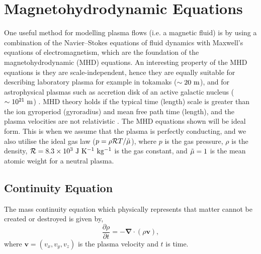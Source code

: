 \documentclass[12pt]{ociamthesis}
\newcommand{\bs}[1]{\boldsymbol{#1}}
\newcommand{\bn}{\boldsymbol{\nabla}}
\newcommand{\rgas}{\mathcal{R}}
\begin{document}
\section{Magnetohydrodynamic Equations}
\label{section:MHD_eqs}
One useful method for modelling plasma flows (i.e. a magnetic fluid) is by using a combination of the Navier–Stokes equations of fluid dynamics with Maxwell's equations of electromagnetism, which are the foundation of the magnetohydrodynamic (MHD) equations. An interesting property of the MHD equations is they are scale-independent, hence they are equally suitable for describing laboratory plasma for example in tokamaks ($\sim 20~\rm{m}$), and for astrophysical plasmas such as accretion disk of an active galactic nucleus ($\sim 10^{21}~\rm{m}$) \citep{goedbloed2004principles}. MHD theory holds if the typical time (length) scale is greater than the ion gyroperiod (gyroradius) and mean free path time (length), and the plasma velocities are not relativistic \citep{priest2014magnetohydrodynamics}. The MHD equations shown will be ideal form. This is when we assume that the plasma is perfectly conducting, and we also utilise the ideal gas law ($p = \rho \rgas T/\Tilde{\mu}$), where $p$ is the gas pressure, $\rho$ is the density, $\rgas=8.3\times 10^{3}~\rm{J~K^{-1}~kg^{-1}}$ is the gas constant, and $\Tilde{\mu}=1$ is the mean atomic weight for a neutral plasma.
\subsection{Continuity Equation}
\label{section:cont_eq}
The mass continuity equation which physically represents that matter cannot be created or destroyed is given by,
\begin{equation}\label{eq86}
\frac{\partial \rho}{\partial t} = - \bn \cdot (\rho \boldsymbol{v}),
\end{equation}
where $\bs{v}=(v_x,v_y,v_z)$ is the plasma velocity and $t$ is time. 
\end{document}
